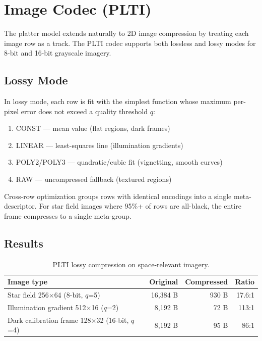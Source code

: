 \documentclass[11pt,a4paper]{article}
\begin{document}
\section{Image Codec (PLTI)}

The platter model extends naturally to 2D image compression by treating each image row as a track. The PLTI codec supports both lossless and lossy modes for 8-bit and 16-bit grayscale imagery.

\subsection{Lossy Mode}

In lossy mode, each row is fit with the simplest function whose maximum per-pixel error does not exceed a quality threshold $q$:
\begin{enumerate}
\item CONST --- mean value (flat regions, dark frames)
\item LINEAR --- least-squares line (illumination gradients)
\item POLY2/POLY3 --- quadratic/cubic fit (vignetting, smooth curves)
\item RAW --- uncompressed fallback (textured regions)
\end{enumerate}

Cross-row optimization groups rows with identical encodings into a single meta-descriptor. For star field images where 95\%+ of rows are all-black, the entire frame compresses to a single meta-group.

\subsection{Results}

\begin{table}[H]
\centering
\begin{tabular}{@{}lrrr@{}}
\toprule
\textbf{Image type} & \textbf{Original} & \textbf{Compressed} & \textbf{Ratio} \\
\midrule
Star field 256$\times$64 (8-bit, $q$=5) & 16,384 B & 930 B & 17.6:1 \\
Illumination gradient 512$\times$16 ($q$=2) & 8,192 B & 72 B & 113:1 \\
Dark calibration frame 128$\times$32 (16-bit, $q$=4) & 8,192 B & 95 B & 86:1 \\
\bottomrule
\end{tabular}
\caption{PLTI lossy compression on space-relevant imagery.}
\end{table}
\end{document}
